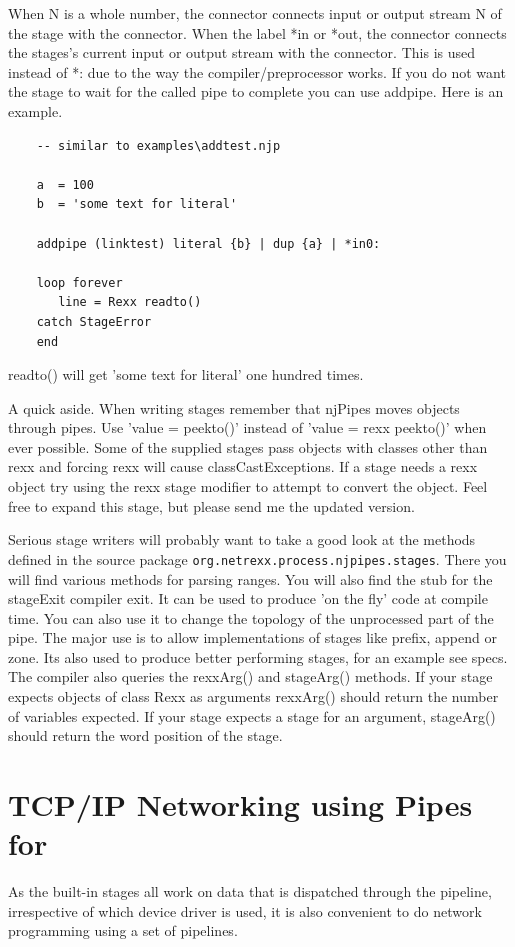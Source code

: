 When N is a whole number, the connector connects input or output stream N of the stage with the connector.
When the label *in or *out, the connector connects the stages's current input or output stream with the connector.  This is used instead of *: due to the way the compiler/preprocessor works.
If you do not want the stage to wait for the called pipe to complete you can use addpipe.  Here is an example.
\begin{lstlisting}
    -- similar to examples\addtest.njp

    a  = 100
    b  = 'some text for literal'

    addpipe (linktest) literal {b} | dup {a} | *in0:

    loop forever
       line = Rexx readto()
    catch StageError
    end
\end{lstlisting}
    readto() will get 'some text for literal' one hundred times.

A quick aside.  When writing stages remember that njPipes moves objects through pipes.  Use 'value = peekto()' instead of 'value = rexx peekto()' when ever possible.  Some of the supplied stages pass objects with classes other than rexx and forcing rexx will cause classCastExceptions. If a stage needs a rexx object try using the rexx stage modifier to attempt to convert the object.  Feel free to expand this stage, but please send me the updated version.

Serious stage writers will probably want to take a good look at the
methods defined in the \nr{} source package \texttt{org.netrexx.process.njpipes.stages}.  There you will find various methods for parsing ranges.  You will also find the stub for the stageExit compiler exit.  It can be used to produce 'on the fly' code at compile time.  You can also use it to change the topology of the unprocessed part of the pipe.  The major use is to allow implementations of stages like prefix, append or zone.  Its also used to produce better performing stages, for an example see specs.
The compiler also queries the rexxArg() and stageArg() methods.  If your stage expects objects of class Rexx as arguments rexxArg() should return the number of variables expected.  If your stage expects a stage for an argument, stageArg() should return the word position of the stage.

\chapter{TCP/IP Networking using Pipes for \nr{}}
As the built-in stages all work on data that is dispatched through the
pipeline, irrespective of which device driver is used, it is also
convenient to do network programming using a set of pipelines.

